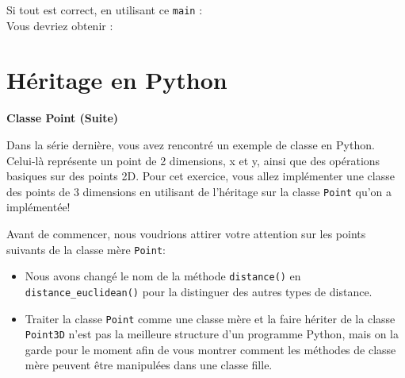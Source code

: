 Si tout est correct, en utilisant ce \lstinline{main} : \\

 

Vous devriez obtenir : \\

 

\newpage

\section{Héritage en Python \optionnel}
\begin{Exercice}[15 minutes]\textbf{Classe Point (Suite)}

Dans la série dernière, vous avez rencontré un exemple de classe en Python. Celui-là représente un point de 2 dimensions, x et y, ainsi que des opérations basiques sur des points 2D. Pour cet exercice, vous allez implémenter une classe des points de 3 dimensions en utilisant de l'héritage sur la classe \lstinline{Point} qu'on a implémentée! 


Avant de commencer, nous voudrions attirer votre attention sur les points suivants de la classe mère \lstinline{Point}:
\begin{itemize}
	\item Nous avons changé le nom de la méthode \lstinline{distance()} en \lstinline{distance_euclidean()} pour la distinguer des autres types de distance. 
	\item Traiter la classe \lstinline{Point} comme une classe mère et la faire hériter de la classe \lstinline{Point3D} n'est pas la meilleure structure d'un programme Python, mais on la garde pour le moment afin de vous montrer comment les méthodes de classe mère peuvent être manipulées dans une classe fille.
\end{itemize}


\end{Exercice}
